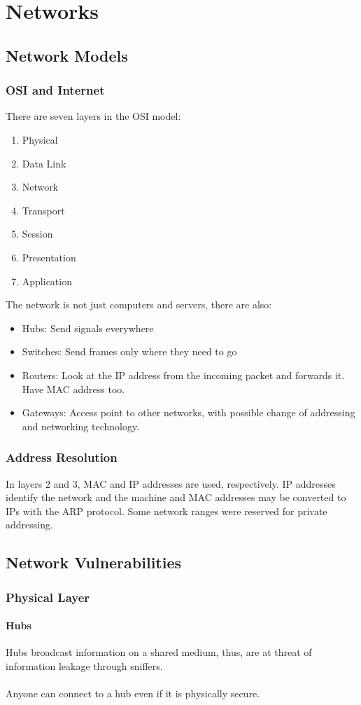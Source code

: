 \documentclass[10pt,a4paper]{report}
\begin{document}
\chapter{Networks}
\section{Network Models}
\subsection{OSI and Internet}
There are seven layers in the OSI model:
\begin{enumerate}
\item Physical
\item Data Link
\item Network
\item Transport
\item Session
\item Presentation
\item Application
\end{enumerate}
The network is not just computers and servers, there are also:
\begin{itemize}
\item Hubs: Send signals everywhere
\item Switches: Send frames only where they need to go
\item Routers: Look at the IP address from the incoming packet and forwards it. Have MAC address too.
\item Gateways: Access point to other networks, with possible change of addressing and networking technology.
\end{itemize}
\subsection{Address Resolution}
In layers 2 and 3, MAC and IP addresses are used, respectively. IP addresses identify the network and
the machine and MAC addresses may be converted to IPs with the ARP protocol. Some network ranges were reserved for private addressing.
\section{Network Vulnerabilities}
\subsection{Physical Layer}
\subsubsection{Hubs}
Hubs broadcast information on a shared medium, thus, are at threat of information leakage through sniffers.\\
\\
Anyone can connect to a hub even if it is physically secure.
\end{document}
